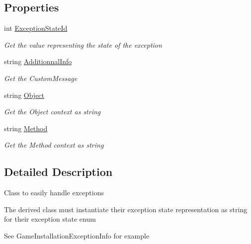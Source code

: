 \subsection*{Properties}
\begin{DoxyCompactItemize}
\item 
int \hyperlink{class_s_e_mod_a_p_i_1_1_support_1_1_auto_exception_a27225fa200b9e876403b30c8e3179179}{Exception\+State\+Id}
\begin{DoxyCompactList}\small\item\em Get the value representing the state of the exception \end{DoxyCompactList}\item 
string \hyperlink{class_s_e_mod_a_p_i_1_1_support_1_1_auto_exception_ac4b82e79569eae8a61710e98246cc994}{Additionnal\+Info}
\begin{DoxyCompactList}\small\item\em Get the Custom\+Message \end{DoxyCompactList}\item 
string \hyperlink{class_s_e_mod_a_p_i_1_1_support_1_1_auto_exception_a0583b17fad60a355f23cffa1885e5d7e}{Object}
\begin{DoxyCompactList}\small\item\em Get the Object context as string \end{DoxyCompactList}\item 
string \hyperlink{class_s_e_mod_a_p_i_1_1_support_1_1_auto_exception_aecf1db9ecc69bc498a8e606fde1185d8}{Method}
\begin{DoxyCompactList}\small\item\em Get the Method context as string \end{DoxyCompactList}\end{DoxyCompactItemize}


\subsection{Detailed Description}



\begin{DoxyItemize}
\item Class to easily handle exceptions
\item The derived class must instantiate their exception state representation as string for their exception state enum
\item See Game\+Installation\+Exception\+Info for example 
\end{DoxyItemize}

